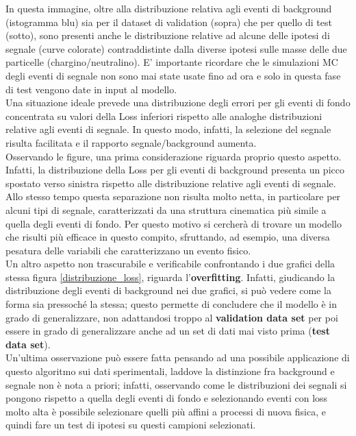 In questa immagine, oltre alla distribuzione relativa agli eventi di background (istogramma blu) sia per il dataset di validation (sopra) che per quello di test (sotto), sono presenti anche le distribuzione relative ad alcune delle ipotesi di segnale (curve colorate) contraddistinte dalla diverse ipotesi sulle masse delle due particelle (chargino/neutralino). E' importante ricordare che le simulazioni MC degli eventi di segnale non sono mai state usate fino ad ora e solo in questa fase di test vengono date in input al modello. \\
Una situazione ideale prevede una distribuzione degli errori per gli eventi di fondo concentrata su valori della Loss inferiori rispetto alle analoghe distribuzioni relative agli eventi di segnale. In questo modo, infatti, la selezione del segnale risulta facilitata e il rapporto segnale/background aumenta.\\
Osservando le figure, una prima considerazione riguarda proprio questo aspetto. Infatti, la distribuzione della Loss per gli eventi di background presenta un picco spostato verso sinistra rispetto alle distribuzione relative agli eventi di segnale. Allo stesso tempo questa separazione non risulta molto netta, in particolare per alcuni tipi di segnale, caratterizzati da una struttura cinematica più simile a quella degli eventi di fondo. Per questo motivo si cercherà di trovare un modello che risulti più efficace in questo compito, sfruttando, ad esempio, una diversa pesatura delle variabili che caratterizzano un evento fisico.\\
Un altro aspetto non trascurabile e verificabile confrontando i due grafici della stessa figura \ref{distribuzione_loss}, riguarda l'\textbf{overfitting}. Infatti, giudicando la distribuzione degli eventi di background nei due grafici, si può vedere come la forma sia pressoché la stessa; questo permette di concludere che il modello è in grado di generalizzare, non adattandosi troppo al \textbf{validation data set} per poi essere in grado di generalizzare anche ad un set di dati mai visto prima (\textbf{test data set}).\\
Un'ultima osservazione può essere fatta pensando ad una possibile applicazione di questo algoritmo sui dati sperimentali, laddove la distinzione fra background e segnale non è nota a priori; infatti, osservando come le distribuzioni dei segnali si pongono rispetto a quella degli eventi di fondo e selezionando eventi con loss molto alta è possibile selezionare quelli più affini a processi di nuova fisica, e quindi fare un test di ipotesi su questi campioni selezionati.

